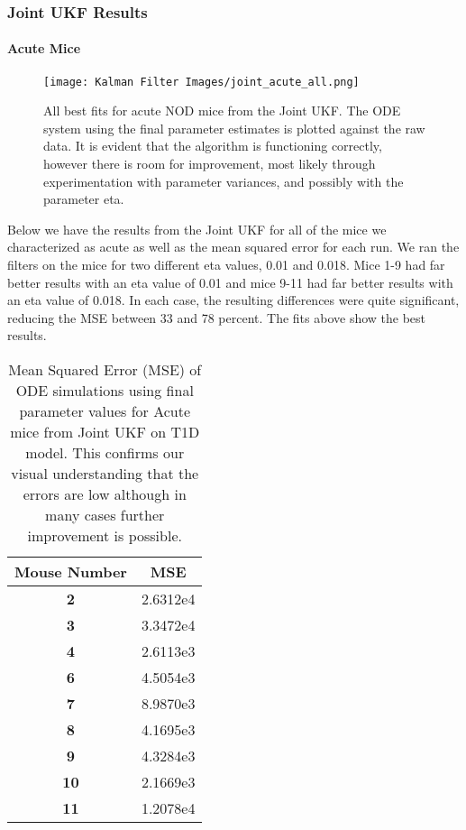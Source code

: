 \subsubsection{Joint UKF Results}

\paragraph{Acute Mice}

\begin{figure}[H]
    \centering
    \texttt{[image: Kalman Filter Images/joint\_acute\_all.png]}
    \caption{All best fits for acute NOD mice from the Joint UKF. The ODE system using the final parameter estimates is plotted against the raw data. It is evident that the algorithm is functioning correctly, however there is room for improvement, most likely through experimentation with parameter variances, and possibly with the parameter eta.}
\end{figure}

Below we have the results from the Joint UKF for all of the mice we characterized as acute as well as the mean squared error for each run. We ran the filters on the mice for two different eta values, 0.01 and 0.018. Mice 1-9 had far better results with an eta value of  0.01 and mice 9-11 had far better results  with an eta value of 0.018. In each case, the resulting differences were quite significant, reducing the MSE between 33 and 78 percent. The fits above show the best results.

\begin{table}[H]
  \begin{center}
    \label{tab:table1}
    \begin{tabular}{c|c} %
      \textbf{Mouse Number} & \textbf{MSE} \\
      \hline
      \textbf{2} &  2.6312e4\\
      \textbf{3} & 3.3472e4\\
      \textbf{4} & 2.6113e3\\
      \textbf{6} & 4.5054e3\\
      \textbf{7} & 8.9870e3\\
      \textbf{8} & 4.1695e3\\
      \textbf{9} & 4.3284e3\\
      \textbf{10} & 2.1669e3\\
      \textbf{11} & 1.2078e4
    \end{tabular}
    \caption{Mean Squared Error (MSE) of ODE simulations using final parameter values for Acute mice from Joint UKF on T1D model. This confirms our visual understanding that the errors are low although in many cases further improvement is possible.}
  \end{center}
\end{table}

